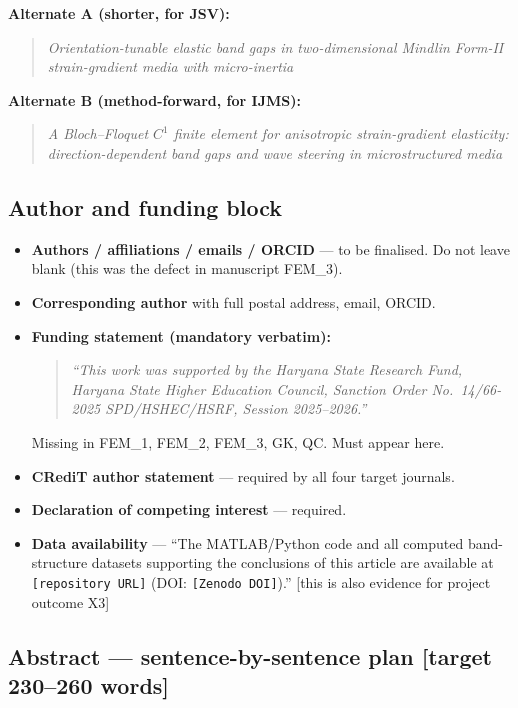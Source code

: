 \documentclass[11pt,a4paper]{article}
\newcommand{\bp}[1]{\textcolor{accent}{\textsf{\footnotesize [#1]}}}
\begin{document}
\textbf{Alternate A (shorter, for JSV):}
\begin{quote}\itshape
Orientation-tunable elastic band gaps in two-dimensional Mindlin Form-II
strain-gradient media with micro-inertia
\end{quote}

\textbf{Alternate B (method-forward, for IJMS):}
\begin{quote}\itshape
A Bloch--Floquet $C^1$ finite element for anisotropic strain-gradient elasticity:
direction-dependent band gaps and wave steering in microstructured media
\end{quote}

\subsection{Author and funding block}

\begin{itemize}
\item \textbf{Authors / affiliations / emails / ORCID} --- to be finalised. \textcolor{warn}{Do not leave blank} (this was the defect in manuscript FEM\_3).
\item \textbf{Corresponding author} with full postal address, email, ORCID.
\item \textbf{Funding statement (mandatory verbatim):}
\begin{quote}\footnotesize\itshape
``This work was supported by the Haryana State Research Fund, Haryana State Higher
Education Council, Sanction Order No.\ 14/66-2025 SPD/HSHEC/HSRF, Session 2025--2026.''
\end{quote}
\textcolor{warn}{Missing in FEM\_1, FEM\_2, FEM\_3, GK, QC. Must appear here.}
\item \textbf{CRediT author statement} --- required by all four target journals.
\item \textbf{Declaration of competing interest} --- required.
\item \textbf{Data availability} --- ``The MATLAB/Python code and all computed band-structure datasets supporting the conclusions of this article are available at \texttt{[repository URL]} (DOI: \texttt{[Zenodo DOI]}).'' \bp{this is also evidence for project outcome X3}
\end{itemize}

\subsection{Abstract --- sentence-by-sentence plan \bp{target 230--260 words}}
\end{document}
